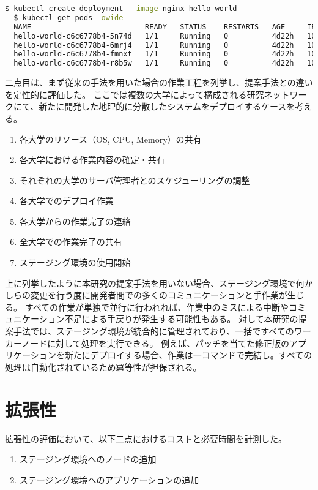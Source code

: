 \begin{lstlisting}[language=bash]
  $ kubectl create deployment --image nginx hello-world
  $ kubectl get pods -owide
  NAME                          READY   STATUS    RESTARTS   AGE     IP          NODE       NOMINATED NODE   READINESS GATES
  hello-world-c6c6778b4-5n74d   1/1     Running   0          4d22h   10.44.0.1   node01     <none>           <none>
  hello-world-c6c6778b4-6mrj4   1/1     Running   0          4d22h   10.42.0.1   node03     <none>           <none>
  hello-world-c6c6778b4-fmnxt   1/1     Running   0          4d22h   10.47.0.1   node02     <none>           <none>
  hello-world-c6c6778b4-r8b5w   1/1     Running   0          4d22h   10.44.0.2   node04   <none>           <none>
\end{lstlisting}

二点目は、まず従来の手法を用いた場合の作業工程を列挙し、提案手法との違いを定性的に評価した。
ここでは複数の大学によって構成される研究ネットワークにて、新たに開発した地理的に分散したシステムをデプロイするケースを考える。

\begin{enumerate}
  \item 各大学のリソース（OS, CPU, Memory）の共有
  \item 各大学における作業内容の確定・共有
  \item それぞれの大学のサーバ管理者とのスケジューリングの調整
  \item 各大学でのデプロイ作業
  \item 各大学からの作業完了の連絡
  \item 全大学での作業完了の共有
  \item ステージング環境の使用開始
\end{enumerate}

上に列挙したように本研究の提案手法を用いない場合、ステージング環境で何かしらの変更を行う度に開発者間での多くのコミュニケーションと手作業が生じる。
すべての作業が単独で並行に行われれば、作業中のミスによる中断やコミュニケーション不足による手戻りが発生する可能性もある。
対して本研究の提案手法では、ステージング環境が統合的に管理されており、一括ですべてのワーカーノードに対して処理を実行できる。
例えば、パッチを当てた修正版のアプリケーションを新たにデプロイする場合、作業は一コマンドで完結し。すべての処理は自動化されているため冪等性が担保される。

\section{拡張性}
\label{evaluation:method}

拡張性の評価において、以下二点におけるコストと必要時間を計測した。

\begin{enumerate}
  \item ステージング環境へのノードの追加
  \item ステージング環境へのアプリケーションの追加
\end{enumerate}

